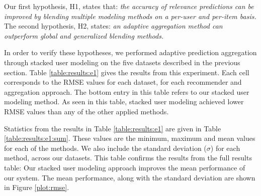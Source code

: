 Our first hypothesis, H1, states that:
{
  \itshape
  the accuracy of relevance predictions can be improved
  by blending multiple modeling methods on a per-user and per-item basis.
}
The second hypothesis, H2, states:
{
  \itshape
  an adaptive aggregation method can outperform global and generalized 
  blending methods.
}

In order to verify these hypotheses, we performed adaptive prediction aggregation
through stacked user modeling on the five datasets described in the previous section.
Table \ref{table:results:e1} gives the results from this experiment.
Each cell corresponds to the RMSE values for each dataset,
for each recommender and aggregation approach.
The bottom entry in this table refers to our stacked user modeling method.
As seen in this table, stacked user modeling achieved
lower RMSE values than any of the other applied methods.

Statistics from the results in Table \ref{table:results:e1} 
are given in Table \ref{table:results:e1:sum}.
These values are the minimum, maximum and mean values
for each of the methods. We also include
the standard deviation ($\sigma$) for each method,
across our datasets.
This table confirms the results from the full results table:
Our stacked user modeling approach improves the mean performance
of our system.
The mean performance, along with the standard deviation
are shown in Figure \ref{plot:rmse}.

